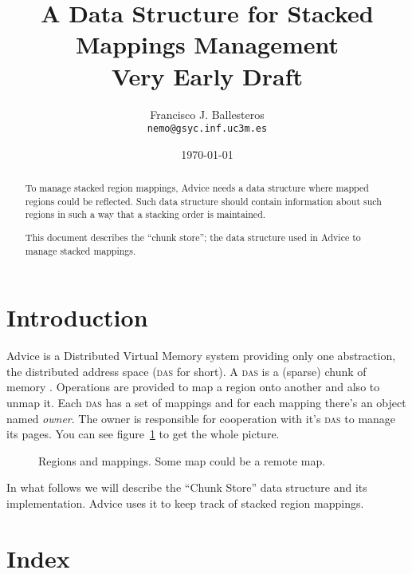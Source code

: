 \documentclass[dvips]{article}
\title{ A Data Structure for Stacked Mappings Management\\
  \vspace{0.5cm}
  \textbf{Very Early Draft}}
\author{ Francisco J. Ballesteros\\
         \texttt{nemo@gsyc.inf.uc3m.es}}
\date{\today}
\begin{document}
\maketitle

\begin{abstract}
  To manage stacked region mappings, Advice needs a data structure
  where mapped regions could be reflected. Such data structure should
  contain information about such regions in such a way that a
  stacking order is maintained.
  
  This document describes the ``chunk store''; the data structure used
  in Advice to manage stacked mappings.

\end{abstract}

\section{Introduction}


Advice is a Distributed Virtual Memory system providing only one
abstraction, the distributed address space (\textsc{das} for short). A
\textsc{das} is a (sparse) chunk of memory
\cite{ballesteros96:_advice,ballesteros96:_adviceobjs}. Operations are
provided to map a region onto another and also to unmap it.  Each
\textsc{das} has a set of mappings and for each mapping there's an
object named \emph{owner}. The owner is responsible for cooperation
with it's \textsc{das} to manage its pages. You can see
figure~\ref{fig:regs} to get the whole picture.

\begin{figure}
  \center{}
  \caption{Regions and mappings. Some map could be a remote map.}
  \label{fig:regs} 
\end{figure}

In what follows we will describe the ``Chunk Store'' data structure
and its implementation. Advice uses it to keep track of stacked region
mappings.


\section*{Index}
\nowebindex
\end{document}
